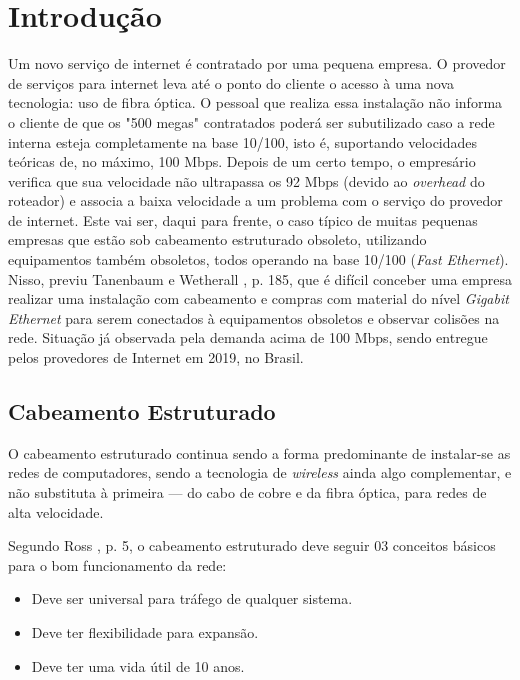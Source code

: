 \documentclass[	DIV=calc,%
							paper=a4,%
							fontsize=12pt,%
							onecolumn]{scrartcl}	 					%
\begin{document}
\clearpage
\renewcommand{\contentsname}{Sumário}
\tableofcontents
\clearpage

\section{Introdução}

Um novo serviço de internet é contratado por uma pequena empresa. O provedor de serviços para internet leva até o ponto do cliente o acesso à uma nova tecnologia: uso de fibra óptica. O pessoal que realiza essa instalação não informa o cliente de que os "500 megas" contratados poderá ser subutilizado caso a rede interna esteja completamente na base 10/100, isto é, suportando velocidades teóricas de, no máximo, 100 Mbps. Depois de um certo tempo, o empresário verifica que sua velocidade não ultrapassa os 92 Mbps (devido ao \textit{overhead} do roteador) e associa a baixa velocidade a um problema com o serviço do provedor de internet. Este vai ser, daqui para frente, o caso típico de muitas pequenas empresas que estão sob cabeamento estruturado obsoleto, utilizando equipamentos também obsoletos, todos operando na base 10/100 (\textit{Fast Ethernet}). Nisso, previu Tanenbaum e Wetherall \cite{t2013}, p. 185, que é difícil conceber uma empresa realizar uma instalação com cabeamento e compras com material do nível \textit{Gigabit Ethernet} para serem conectados à equipamentos obsoletos e observar colisões na rede. Situação já observada pela demanda acima de 100 Mbps, sendo entregue pelos provedores de Internet em 2019, no Brasil.

\subsection{Cabeamento Estruturado}

O cabeamento estruturado continua sendo a forma predominante de instalar-se as redes de computadores, sendo a tecnologia de \textit{wireless} ainda algo complementar, e não substituta à primeira --- do cabo de cobre e da fibra óptica, para redes de alta velocidade.

Segundo Ross \cite{ross2007cabeamento}, p. 5, o cabeamento estruturado deve seguir 03 conceitos básicos para o bom funcionamento da rede:

\begin{itemize}

\item Deve ser universal para tráfego de qualquer sistema.
\item Deve ter flexibilidade para expansão.
\item Deve ter uma vida útil de 10 anos.



\end{itemize}
\end{document}
